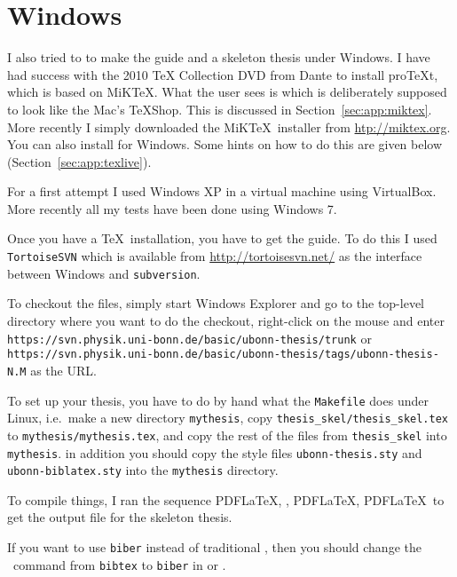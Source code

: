 \section{Windows}
\label{sec:app:windows}

I also tried to to make the guide and a skeleton thesis under
Windows. I have had success with the 2010 \TeX{} Collection DVD from Dante to install
pro\TeX t, which is based on MiK\TeX. 
What the user sees is \TeXworks
which is deliberately supposed to look like the Mac's \TeX Shop. This
is discussed in Section~\ref{sec:app:miktex}.
More recently I simply downloaded the MiK\TeX\ installer from
\url{htp://miktex.org}.
You can also install \TeXLive for Windows. Some hints on how to do
this are given below (Section~\ref{sec:app:texlive}).

For a first attempt I used Windows XP in a virtual machine using
VirtualBox. More recently all my tests have been done using Windows 7.

Once you have a \TeX\ installation, you have to get the guide. To do
this I used \texttt{TortoiseSVN} which is available from
\url{http://tortoisesvn.net/} as the interface between Windows and
\texttt{subversion}.

To checkout the files, simply start Windows Explorer and go to the
top-level directory where you want to do the checkout, right-click on
the mouse and enter\\
\texttt{https://svn.physik.uni-bonn.de/basic/ubonn-thesis/trunk} or\\
\texttt{https://svn.physik.uni-bonn.de/basic/ubonn-thesis/tags/ubonn-thesis-N.M}
as the URL.

To set up your thesis, you have to do by hand what the
\texttt{Makefile} does under Linux, i.e.\ make a new directory
\texttt{mythesis}, copy \texttt{thesis\_skel/thesis\_skel.tex} to
\texttt{mythesis/mythesis.tex}, and copy the rest of the files from
\texttt{thesis\_skel} into \texttt{mythesis}. in addition you should
copy the style files \texttt{ubonn-thesis.sty} and \texttt{ubonn-biblatex.sty} into the
\texttt{mythesis} directory.

To compile things, I ran the sequence PDF\LaTeX, \BibTeX, PDF\LaTeX,
PDF\LaTeX\ to get the output file for the skeleton thesis.

If you want to use \texttt{biber} instead of traditional \BibTeX, then you should
change the \BibTeX\ command from \texttt{bibtex} to \texttt{biber} in
\TeXstudio or \TeXworks.

